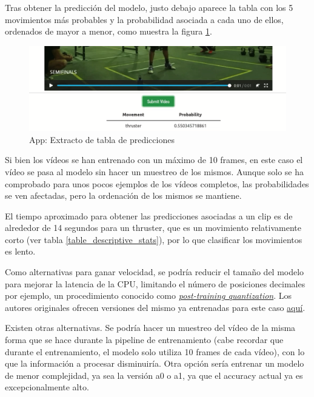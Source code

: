 Tras obtener la predicción del modelo, justo debajo aparece la tabla con los 5 movimientos más probables y la probabilidad asociada a cada uno de ellos, ordenados de mayor a menor, como muestra la figura \ref{app_3}.

\begin{figure}[H]
    \centering
		\includegraphics[width=\textwidth]{figs/app_3.png}
\caption{App: Extracto de tabla de predicciones}\label{app_3}
\end{figure}

Si bien los vídeos se han entrenado con un máximo de 10 frames, en este caso el vídeo se pasa al modelo sin hacer un muestreo de los mismos. Aunque solo se ha comprobado para unos pocos ejemplos de los vídeos completos, las probabilidades se ven afectadas, pero la ordenación de los mismos se mantiene.

El tiempo aproximado para obtener las predicciones asociadas a un clip es de alrededor de 14 segundos para un thruster, que es un movimiento relativamente corto (ver tabla \ref{table_descriptive_stats}), por lo que clasificar los movimientos es lento.

Como alternativas para ganar velocidad, se podría reducir el tamaño del modelo para mejorar la latencia de la CPU, limitando el número de posiciones decimales por ejemplo, un procedimiento conocido como \href{https://www.tensorflow.org/lite/performance/post_training_quantization}{\textit{post-training quantization}}. Los autores originales ofrecen versiones del mismo ya entrenadas para este caso \href{https://tfhub.dev/google/collections/movinet/1}{aquí}.

Existen otras alternativas. Se podría hacer un muestreo del vídeo de la misma forma que se hace durante la pipeline de entrenamiento (cabe recordar que durante el entrenamiento, el modelo solo utiliza 10 frames de cada vídeo), con lo que la información a procesar disminuiría. Otra opción sería entrenar un modelo de menor complejidad, ya sea la versión a0 o a1, ya que el accuracy actual ya es excepcionalmente alto.



